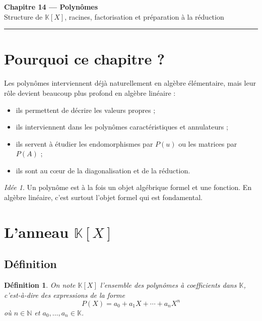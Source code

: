 \documentclass[11pt,a4paper]{article}
\newtheorem{definition}{Définition}[section]
\theoremstyle{remark}
\newtheorem*{idee}{Idée}
\newcommand{\N}{\mathbb{N}}
\newcommand{\K}{\mathbb{K}}
\begin{document}
\begin{center}
    {\LARGE \textbf{Chapitre 14 --- Polynômes}}\\[0.4em]
    {\large Structure de \(\K[X]\), racines, factorisation et préparation à la réduction}
\end{center}

\hrule
\vspace{1em}

\tableofcontents

\newpage

\section{Pourquoi ce chapitre ?}

Les polynômes interviennent déjà naturellement en algèbre élémentaire, mais leur rôle devient beaucoup plus profond en algèbre linéaire :
\begin{itemize}
    \item ils permettent de décrire les valeurs propres ;
    \item ils interviennent dans les polynômes caractéristiques et annulateurs ;
    \item ils servent à étudier les endomorphismes par \(P(u)\) ou les matrices par \(P(A)\) ;
    \item ils sont au cœur de la diagonalisation et de la réduction.
\end{itemize}

\begin{idee}
Un polynôme est à la fois un objet algébrique formel et une fonction. En algèbre linéaire, c’est surtout l’objet formel qui est fondamental.
\end{idee}

\section{L’anneau \(\K[X]\)}

\subsection{Définition}

\begin{definition}
On note \(\K[X]\) l’ensemble des polynômes à coefficients dans \(\K\), c’est-à-dire des expressions de la forme
\[
P(X)=a_0+a_1X+\cdots+a_nX^n
\]
où \(n\in\N\) et \(a_0,\dots,a_n\in\K\).
\end{definition}
\end{document}
